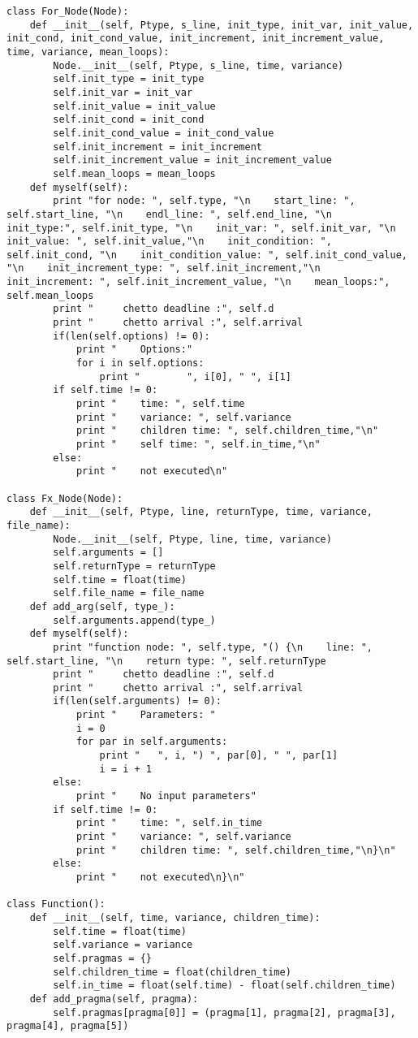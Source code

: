 \documentclass[a4paper,10pt,twoside]{book}
\begin{document}
\begin{lstlisting}[language=CCC, caption=pargraph.py]
class For_Node(Node): 
    def __init__(self, Ptype, s_line, init_type, init_var, init_value, init_cond, init_cond_value, init_increment, init_increment_value, time, variance, mean_loops):
        Node.__init__(self, Ptype, s_line, time, variance)
        self.init_type = init_type
        self.init_var = init_var
        self.init_value = init_value
        self.init_cond = init_cond
        self.init_cond_value = init_cond_value
        self.init_increment = init_increment
        self.init_increment_value = init_increment_value
        self.mean_loops = mean_loops
    def myself(self):
		print "for node: ", self.type, "\n    start_line: ", self.start_line, "\n    endl_line: ", self.end_line, "\n    init_type:", self.init_type, "\n    init_var: ", self.init_var, "\n    init_value: ", self.init_value,"\n    init_condition: ", self.init_cond, "\n    init_condition_value: ", self.init_cond_value, "\n    init_increment_type: ", self.init_increment,"\n    init_increment: ", self.init_increment_value, "\n    mean_loops:", self.mean_loops
		print "     chetto deadline :", self.d
		print "     chetto arrival :", self.arrival
		if(len(self.options) != 0):
			print "    Options:"
			for i in self.options:
				print "        ", i[0], " ", i[1]
		if self.time != 0:
			print "    time: ", self.time
			print "    variance: ", self.variance
			print "    children time: ", self.children_time,"\n"
			print "    self time: ", self.in_time,"\n"
		else:
			print "    not executed\n"

class Fx_Node(Node):
	def __init__(self, Ptype, line, returnType, time, variance, file_name):
		Node.__init__(self, Ptype, line, time, variance)
		self.arguments = []
		self.returnType = returnType
		self.time = float(time)
		self.file_name = file_name
	def add_arg(self, type_):
		self.arguments.append(type_)
	def myself(self):
		print "function node: ", self.type, "() {\n    line: ", self.start_line, "\n    return type: ", self.returnType
		print "     chetto deadline :", self.d
		print "     chetto arrival :", self.arrival
		if(len(self.arguments) != 0):
			print "    Parameters: "
			i = 0
			for par in self.arguments:
				print "   ", i, ") ", par[0], " ", par[1]
				i = i + 1
		else:
			print "    No input parameters"
		if self.time != 0:
			print "    time: ", self.in_time
			print "    variance: ", self.variance
			print "    children time: ", self.children_time,"\n}\n"
		else:
			print "    not executed\n}\n"

class Function():
	def __init__(self, time, variance, children_time):
		self.time = float(time)
		self.variance = variance
		self.pragmas = {}
		self.children_time = float(children_time)
		self.in_time = float(self.time) - float(self.children_time)
	def add_pragma(self, pragma):
		self.pragmas[pragma[0]] = (pragma[1], pragma[2], pragma[3], pragma[4], pragma[5])


\end{lstlisting}
\end{document}
